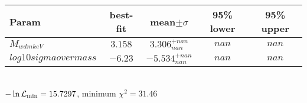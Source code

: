 \begin{tabular}{|l|c|c|c|c|} 
 \hline 
Param & best-fit & mean$\pm\sigma$ & 95\% lower & 95\% upper \\ \hline 
$M_{wdm keV }$ &$3.158$ & $3.306_{nan}^{+nan}$ & $nan$ & $nan$ \\ 
$log10sigmaovermass$ &$-6.23$ & $-5.534_{nan}^{+nan}$ & $nan$ & $nan$ \\ 
\hline 
 \end{tabular} \\ 
$-\ln{\cal L}_\mathrm{min} =15.7297$, minimum $\chi^2=31.46$ \\ 
